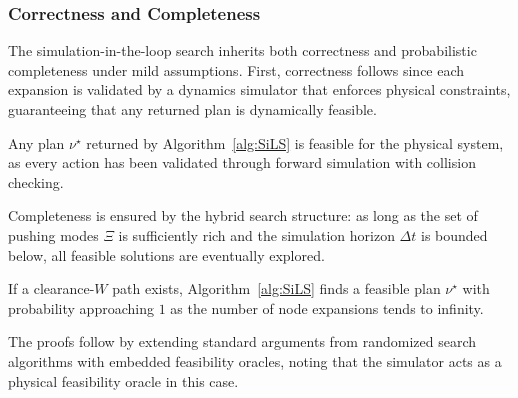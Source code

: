 \subsubsection{Correctness and Completeness}
\label{subsubsec:simloop-theory}
The simulation-in-the-loop search inherits both correctness and probabilistic
completeness under mild assumptions. First, correctness follows since each
expansion is validated by a dynamics simulator that enforces physical
constraints, guaranteeing that any returned plan is dynamically feasible.

\begin{lemma}[Correctness]\label{lemma:correctness}
Any plan $\nu^\star$ returned by Algorithm~\ref{alg:SiLS} is feasible for the
physical system, as every action has been validated through forward
simulation with collision checking.
\end{lemma}

Completeness is ensured by the hybrid search structure: as long as the set
of pushing modes $\Xi$ is sufficiently rich and the simulation horizon
$\Delta t$ is bounded below, all feasible solutions are eventually explored.

\begin{theorem}\label{thm:completeness-simloop}
  If a clearance-$W$ path exists, Algorithm~\ref{alg:SiLS} finds a feasible
  plan $\nu^\star$ with probability approaching $1$ as the number of node
  expansions tends to infinity.
\end{theorem}

The proofs follow by extending standard arguments from randomized search
algorithms with embedded feasibility oracles, noting that the simulator
acts as a physical feasibility oracle in this case.
